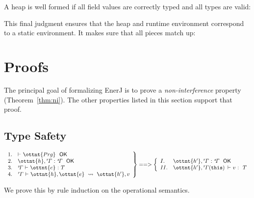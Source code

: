 A heap is well formed if all field values are correctly typed and all
types are valid:

\ottdefnwfheap


This final judgment ensures that the heap and runtime environment
correspond to a static environment.
It makes sure that all pieces match up:

\ottdefnwfenvs



\section{Proofs}
\label{proofs}

The principal goal of formalizing EnerJ is to prove a \emph{non-interference}
property (Theorem~\ref{thm:ni}). The other properties listed in this section
support that proof.


\subsection{Type Safety}

\begin{theorem}
\label{thm:ts}
\[
\left.
\begin{array}{ll}
1. &  \textsf{$\vdash$} \  \ottnt{Prg} \ \  \textsf{OK} \\
2. &  \ottnt{h} ,  \mathit{ {^r}\!\Gamma} \  \textsf{:} \  \mathit{ {^s}\!\Gamma} \ \  \textsf{OK} \\
3. &  \mathit{ {^s}\!\Gamma} \  \textsf{$\vdash$} \  \ottnt{e} \  \textsf{:} \  T \\
4. &  \mathit{ {^r}\!\Gamma} \  \textsf{$\vdash$} \  \ottnt{h} ,  \ottnt{e} \ \leadsto\  \ottnt{h'} ,  v \\
\end{array}
\right\} ==> \left\{
\begin{array}{ll}
I.  &  \ottnt{h'} ,  \mathit{ {^r}\!\Gamma} \  \textsf{:} \  \mathit{ {^s}\!\Gamma} \ \  \textsf{OK} \\
II. &  \ottnt{h'} ,   \mathit{ {^r}\!\Gamma} \!\left( \texttt{\upshape{this}\,\!} \right)  \  \textsf{$\vdash$} \  v \  \textsf{:} \ \  T \\
\end{array}
\right.
\]
\end{theorem}


We prove this by rule induction on the operational semantics.



